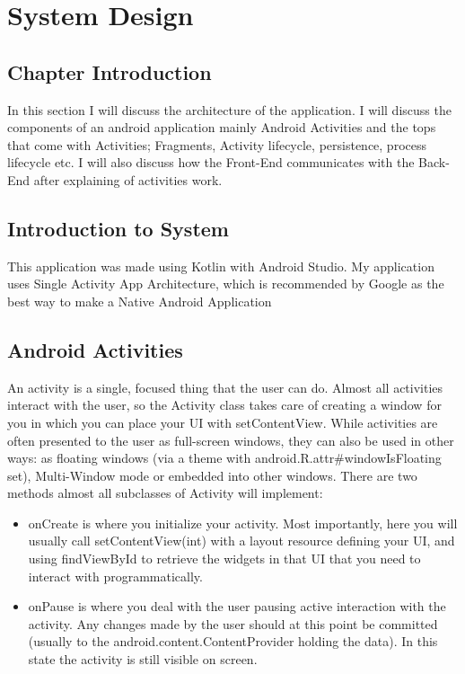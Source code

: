 \chapter{System Design}

\section{Chapter Introduction}
In this section I will discuss the architecture of the application. I will discuss the components of an android application mainly Android Activities and the tops that come with Activities; Fragments, Activity lifecycle, persistence, process lifecycle etc. I will also discuss how the Front-End communicates with the Back-End after explaining of activities work.

\section{Introduction to System}
This application was made using Kotlin with Android Studio. My application uses Single Activity App Architecture, which is recommended by Google as the best way to make a Native Android Application\cite{android_single_activity_blog}

\section{Android Activities}
An activity is a single, focused thing that the user can do. Almost all activities interact with the user, so the Activity class takes care of creating a window for you in which you can place your UI with setContentView. While activities are often presented to the user as full-screen windows, they can also be used in other ways: as floating windows (via a theme with android.R.attr\#windowIsFloating set), Multi-Window mode or embedded into other windows.\cite{android_activity_docs} There are two methods almost all subclasses of Activity will implement: 

\begin{itemize}
    \item onCreate  is where you initialize your activity. Most importantly, here you will usually call setContentView(int) with a layout resource defining your UI, and using findViewById to retrieve the widgets in that UI that you need to interact with programmatically.
    \item onPause is where you deal with the user pausing active interaction with the activity. Any changes made by the user should at this point be committed (usually to the android.content.ContentProvider holding the data). In this state the activity is still visible on screen.
\end{itemize}

